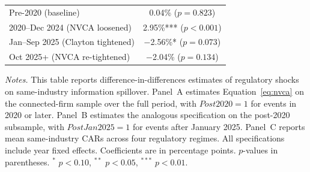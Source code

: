 \begin{table}[htbp]
\begin{threeparttable}
\begin{tabular}{lcccc}
\midrule
Pre-2020 (baseline) & \multicolumn{4}{c}{0.04\% \quad ($p=0.823$)} \\
2020--Dec 2024 (NVCA loosened) & \multicolumn{4}{c}{2.95\%*** \quad ($p<0.001$)} \\
Jan--Sep 2025 (Clayton tightened) & \multicolumn{4}{c}{$-$2.56\%* \quad ($p=0.073$)} \\
Oct 2025+ (NVCA re-tightened) & \multicolumn{4}{c}{$-$2.04\% \quad ($p=0.134$)} \\
\bottomrule
\end{tabular}
\begin{tablenotes}
\footnotesize
\item \textit{Notes.} This table reports difference-in-differences estimates of regulatory shocks on same-industry information spillover. Panel~A estimates Equation~\ref{eq:nvca} on the connected-firm sample over the full period, with $Post2020=1$ for events in 2020 or later. Panel~B estimates the analogous specification on the post-2020 subsample, with $PostJan2025=1$ for events after January 2025. Panel~C reports mean same-industry CARs across four regulatory regimes. All specifications include year fixed effects. Coefficients are in percentage points. $p$-values in parentheses. $^{*}$ $p<0.10$, $^{**}$ $p<0.05$, $^{***}$ $p<0.01$.
\end{tablenotes}
\end{threeparttable}
\end{table}